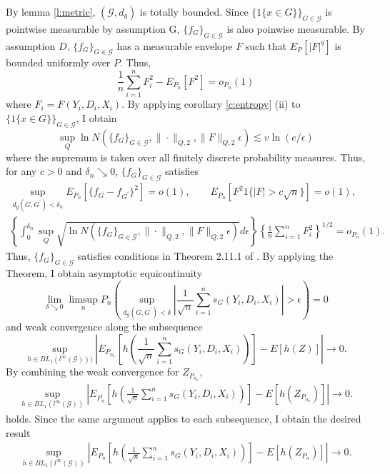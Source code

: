 \documentclass[12pt,oneside,reqno,english]{amsart}
\def\sumn{\sum_{i=1}^{n}}
\theoremstyle{definition}
\begin{document}
By lemma \ref{l:metric}, $(\mathcal{G},d_{g})$ is totally bounded. 
Since $\{1\{x\in G\}\}_{ G\in \mathcal{G} }$ is pointwise measurable by assumption G, $\{f_{G}\}_{G\in\mathcal{G}}$ is also poinwise measurable.  
By assumption $D$, $\{f_{G}\}_{G\in \mathcal{G}}$ has a measurable envelope $F$ such that $E_{P}[|F|^{q}]$ is bounded uniformly over $P$.  
Thus, 
\[\frac{1}{n}\sumn F^{2}_{i}-E_{P_{n}}[F^{2}]=o_{P_{n}}(1)\]
where $F_{i}=F(Y_{i},D_{i},X_{i})$.  
By applying corollary \ref{c:entropy} (ii) to $\{1\{x\in G\}\}_{G\in \mathcal{G}}$, I obtain 
\[\sup_{Q}\ln N(\{f_{G}\}_{G\in \mathcal{G}},\|\cdot\|_{Q,2},\|F\|_{Q,2}\epsilon)\lesssim v\ln(e/\epsilon)\] 
where the supremum is taken over all finitely discrete probability measures. Thus, for any $c>0$ and $\delta_{n}\searrow 0$, 
$\{f_{G}\}_{G\in \mathcal{G}}$ satisfies
\begin{align*}
\sup_{d_{g}(G,G^{\prime})<\delta_{n}}E_{P_{n}}[\{f_{G}-f_{G^{\prime}}\}^{2}]=o(1),\qquad E_{P_{n}}[F^{2}1\{|F|>c\sqrt{n}\}]=o(1),\\
\left\{\int^{\delta_{n}}_{0} \sup_{Q}\sqrt{\ln N(\{f_{G}\}_{G\in \mathcal{G}},\|\cdot\|_{Q,2},\|F\|_{Q,2}\epsilon)}d\epsilon\right\}\left\{\frac{1}{n}\sumn F^{2}_{i}\right\}^{1/2} =o_{P_{n}}(1).
\end{align*}
Thus,  $\{f_{G}\}_{G\in\mathcal{G}}$ satisfies conditions in Theorem 2.11.1 of \cite{VW:96}. By applying the Theorem, 
I obtain asymptotic equicontinuity
\[\lim_{\delta\searrow 0} \limsup_{n}P_{n}\left( \sup_{d_{g}(G,G^{\prime})<\delta} \left| \frac{1}{\sqrt{n}}\sum_{i=1}^{n}s_{G}(Y_{i},D_{i},X_{i})\right| >\epsilon \right)=0\]
and weak convergence along the subsequence
\[\sup_{h\in BL_{1}(l^{\infty}(\mathcal{G})))}\left|E_{P_{n_{a}}}\left[h\left(\frac{1}{\sqrt{n}}\sum_{i=1}^{n}s_{G}(Y_{i},D_{i},X_{i})\right)\right]-E[h(Z)]\right|
\rightarrow 0.\]
By combining the weak convergence for $Z_{P_{n_{a}}}$,
\begin{align*}
\sup_{h\in BL_{1}(l^{\infty}(\mathcal{G}))}\left|E_{P_{n}^{\prime}}\left[h\left(\frac{1}{\sqrt{n}}\sum_{i=1}^{n}s_{G}(Y_{i},D_{i},X_{i})\right)\right]-E[h(Z_{P_{n_{a}}})]\right|\rightarrow 0. 
\end{align*}
holds. Since the same argument applies to each subsequence, I obtain the desired result 
\begin{align*}
\sup_{h\in BL_{1}(l^{\infty}(\mathcal{G}))}\left|E_{P_{n}}\left[h\left(\frac{1}{\sqrt{n}}\sum_{i=1}^{n}s_{G}(Y_{i},D_{i},X_{i})\right)\right]-E[h(Z_{P_{n}})]\right|\rightarrow 0. 
\end{align*}
\end{document}
